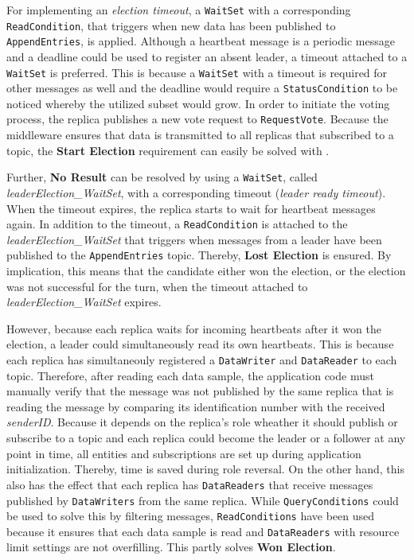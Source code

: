 For implementing an \textit{election timeout}, a \texttt{WaitSet} with a corresponding \texttt{ReadCondition}, that triggers when new data has been published to \texttt{AppendEntries}, is applied.
Although a heartbeat message is a periodic message and a deadline  could be used to register an absent leader, a timeout attached to a \texttt{WaitSet} is preferred.
This is because a \texttt{WaitSet} with a timeout is required for other messages as well and the deadline  would require a \texttt{StatusCondition} to be noticed whereby the utilized  subset would grow.
In order to initiate the voting process, the replica publishes a new vote request to \texttt{RequestVote}.
Because the middleware ensures that data is transmitted to all replicas that subscribed to a topic, the \textbf{Start Election} requirement can easily be solved with .

Further, \textbf{No Result} can be resolved by using a \texttt{WaitSet}, called \textit{leaderElection\_WaitSet}, with a corresponding timeout (\textit{leader ready timeout}).
When the timeout expires, the replica starts to wait for heartbeat messages again.
In addition to the timeout, a \texttt{ReadCondition} is attached to the \textit{leaderElection\_WaitSet} that triggers when messages from a leader have been published to the \texttt{AppendEntries} topic.
Thereby, \textbf{Lost Election} is ensured.
By implication, this means that the candidate either won the election, or the election was not successful for the turn, when the timeout attached to \textit{leaderElection\_WaitSet} expires.

However, because each replica waits for incoming heartbeats after it won the election, a leader could simultaneously read its own heartbeats.
This is because each replica has simultaneouly registered a \texttt{DataWriter} and \texttt{DataReader} to each topic.
Therefore, after reading each data sample, the application code must manually verify that the message was not published by the same replica that is reading the message by comparing its identification number with the received \textit{senderID}.
Because it depends on the replica's role wheather it should publish or subscribe to a topic and each replica could become the leader or a follower at any point in time, all  entities and subscriptions are set up during application initialization.
Thereby, time is saved during role reversal.
On the other hand, this also has the effect that each replica has \texttt{DataReaders} that receive messages published by \texttt{DataWriters} from the same replica.
While \texttt{QueryConditions} could be used to solve this by filtering messages, \texttt{ReadConditions} have been used because it ensures that each data sample is read and \texttt{DataReaders} with resource limit  settings are not overfilling.
This partly solves \textbf{Won Election}.

